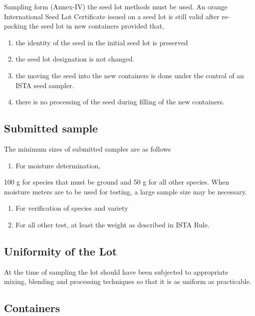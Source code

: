 \documentclass[]{book}
\providecommand{\tightlist}{%
  \setlength{\itemsep}{0pt}\setlength{\parskip}{0pt}}
\begin{document}
Sampling form (Annex-IV) the seed lot methods must be used. An orange
International Seed Lot Certificate issued on a seed lot is still valid
after re-packing the seed lot in new containers provided that,

\begin{enumerate}
\def\labelenumi{\alph{enumi})}
\item
  the identity of the seed in the initial seed lot is preserved
\item
  the seed lot designation is not changed.
\item
  the moving the seed into the new containers is done under the control
  of an ISTA seed sampler.
\item
  there is no processing of the seed during filling of the new
  containers.
\end{enumerate}

\subsection{Submitted sample}\label{submitted-sample-1}

The minimum sizes of submitted samples are as follows

\begin{enumerate}
\def\labelenumi{\alph{enumi})}
\tightlist
\item
  For moisture determination,
\end{enumerate}

100 g for species that must be ground and 50 g for all other species.
When moisture meters are to be used for testing, a large sample size may
be necessary.

\begin{enumerate}
\def\labelenumi{\alph{enumi})}
\setcounter{enumi}{1}
\item
  For verification of species and variety
\item
  For all other test, at least the weight as described in ISTA Rule.
\end{enumerate}

\subsection{Uniformity of the Lot}\label{uniformity-of-the-lot}

At the time of sampling the lot should have been subjected to
appropriate mixing, blending and processing techniques so that it is as
uniform as practicable.

\subsection{Containers}\label{containers}
\end{document}
